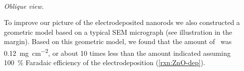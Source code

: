 \documentclass[webedition,openright,titles,swedish,english]{LuaUUThesis}\usepackage[]{graphicx}\usepackage[]{xcolor}
\begin{document}
{
\scriptsize\itshape%
\\Oblique view.
}

To improve our picture of the electrodeposited  nanorods we also
constructed a geometric model based on a typical SEM micrograph
(see illustration in the margin).
Based on this geometric model, we found that the amount of \ZnO\ was
\qty{0.12}{\mg\per\square\cm}, or about \num{10} times less than the amount
indicated assuming \qty{100}{\percent} Faradaic efficiency of the electrodeposition
(\cref{rxn:ZnO-dep}).




%
\end{document}
